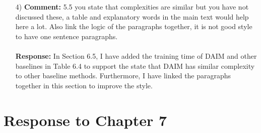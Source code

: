 \documentclass[11pt]{article}
\begin{document}
\begin{enumerate}
\item[4)] \textbf{Comment:} 5.5 you state that complexities are similar but you have not discussed these, a table and explanatory words in the main text would help here a lot. Also link the logic of the paragraphs together, it is not good style to have one sentence paragraphs.\\ \\
\textbf{Response:} In Section 6.5, I have added the training time of DAIM and other baselines in Table 6.4 to support the state that DAIM has similar complexity to other baseline methods. Furthermore, I have linked the paragraphs together in this section to improve the style.
\end{enumerate}

\newpage
\section*{Response to Chapter 7}
\end{document}
